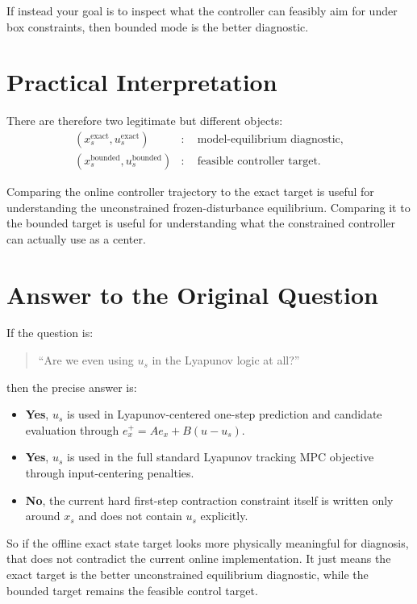 \documentclass[11pt]{article}
\begin{document}
If instead your goal is to inspect what the controller can feasibly aim for under box constraints, then bounded mode is the better diagnostic.

\section{Practical Interpretation}

There are therefore two legitimate but different objects:
\begin{align}
(x_s^{\mathrm{exact}},u_s^{\mathrm{exact}}) &:\quad \text{model-equilibrium diagnostic}, \\
(x_s^{\mathrm{bounded}},u_s^{\mathrm{bounded}}) &:\quad \text{feasible controller target}.
\end{align}

Comparing the online controller trajectory to the exact target is useful for understanding the unconstrained frozen-disturbance equilibrium. Comparing it to the bounded target is useful for understanding what the constrained controller can actually use as a center.

\section{Answer to the Original Question}

If the question is:
\begin{quote}
``Are we even using $u_s$ in the Lyapunov logic at all?''
\end{quote}
then the precise answer is:
\begin{itemize}
\item \textbf{Yes}, $u_s$ is used in Lyapunov-centered one-step prediction and candidate evaluation through $e_x^+ = Ae_x + B(u-u_s)$.
\item \textbf{Yes}, $u_s$ is used in the full standard Lyapunov tracking MPC objective through input-centering penalties.
\item \textbf{No}, the current hard first-step contraction constraint itself is written only around $x_s$ and does not contain $u_s$ explicitly.
\end{itemize}

So if the offline exact state target looks more physically meaningful for diagnosis, that does not contradict the current online implementation. It just means the exact target is the better unconstrained equilibrium diagnostic, while the bounded target remains the feasible control target.
\end{document}
